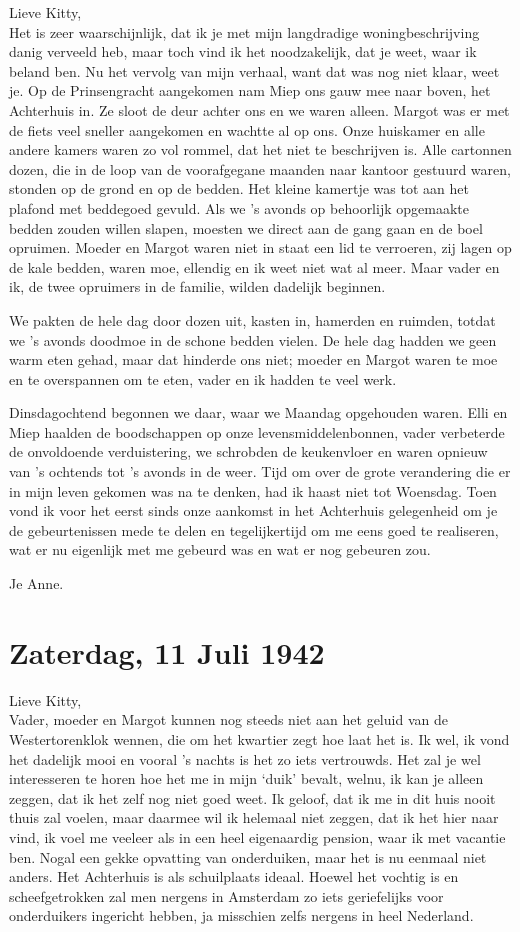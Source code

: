 \documentclass{book}
\begin{document}
Lieve Kitty,\\
Het is zeer waarschijnlijk, dat ik je met mijn langdradige
woningbeschrijving danig verveeld heb, maar toch vind ik het noodzakelijk, dat
je weet, waar ik beland ben. Nu het vervolg van mijn verhaal, want dat was nog
niet klaar, weet je. Op de Prinsengracht aangekomen nam Miep ons gauw mee naar
boven, het Achterhuis in. Ze sloot de deur achter ons en we waren alleen. Margot
was er met de fiets veel sneller aangekomen en wachtte al op ons. Onze huiskamer
en alle andere kamers waren zo vol rommel, dat het niet te beschrijven is. Alle
cartonnen dozen, die in de loop van de voorafgegane maanden naar kantoor
gestuurd waren, stonden op de grond en op de bedden. Het kleine kamertje was tot
aan het plafond met beddegoed gevuld. Als we 's avonds op behoorlijk opgemaakte
bedden zouden willen slapen, moesten we direct aan de gang gaan en de boel
opruimen. Moeder en Margot waren niet in staat een lid te verroeren, zij lagen
op de kale bedden, waren moe, ellendig en ik weet niet wat al meer. Maar vader
en ik, de twee opruimers in de familie, wilden dadelijk beginnen.

We pakten de hele dag door dozen uit, kasten in, hamerden en ruimden, totdat we
's avonds doodmoe in de schone bedden vielen. De hele dag hadden we geen warm
eten gehad, maar dat hinderde ons niet; moeder en Margot waren te moe en te
overspannen om te eten, vader en ik hadden te veel werk.

Dinsdagochtend begonnen we daar, waar we Maandag opgehouden waren. Elli en Miep
haalden de boodschappen op onze levensmiddelenbonnen, vader verbeterde de
onvoldoende verduistering, we schrobden de keukenvloer en waren opnieuw van 's
ochtends tot 's avonds in de weer. Tijd om over de grote verandering die er in
mijn leven gekomen was na te denken, had ik haast niet tot Woensdag. Toen vond
ik voor het eerst sinds onze aankomst in het Achterhuis gelegenheid om je de
gebeurtenissen mede te delen en tegelijkertijd om me eens goed te realiseren,
wat er nu eigenlijk met me gebeurd was en wat er nog gebeuren zou.

Je Anne.

\section*{Zaterdag, 11 Juli 1942}

Lieve Kitty,\\
Vader, moeder en Margot kunnen nog steeds niet aan het geluid van
de Westertorenklok wennen, die om het kwartier zegt hoe laat het is. Ik wel, ik
vond het dadelijk mooi en vooral 's nachts is het zo iets vertrouwds. Het zal je
wel interesseren te horen hoe het me in mijn `duik' bevalt, welnu, ik kan je
alleen zeggen, dat ik het zelf nog niet goed weet. Ik geloof, dat ik me in dit
huis nooit thuis zal voelen, maar daarmee wil ik helemaal niet zeggen, dat ik
het hier naar vind, ik voel me veeleer als in een heel eigenaardig pension, waar
ik met vacantie ben. Nogal een gekke opvatting van onderduiken, maar het is nu
eenmaal niet anders. Het Achterhuis is als schuilplaats ideaal. Hoewel het
vochtig is en scheefgetrokken zal men nergens in Amsterdam zo iets geriefelijks
voor onderduikers ingericht hebben, ja misschien zelfs nergens in heel
Nederland.
\end{document}
